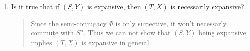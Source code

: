 \documentclass[letter]{article}
\begin{document}
\begin{enumerate}
\begin{enumerate}
\begin{enumerate}
\begin{quote}
					    
					    
					    
					    
					\end{quote}
					
					\item Is it true that if $(S,Y)$ is expansive, then $(T,X)$ is necessarily expansive?
					\begin{quote}
					    Since the semi-conjugacy $\Phi$ is only surjective, it won't necessarly commute with $S^n$. Thus we can not show that $(S,Y)$ being expansive implies $(T,X)$ is expansive in general.
					\end{quote}
					

\end{enumerate}
\end{enumerate}
\end{enumerate}
\end{document}
